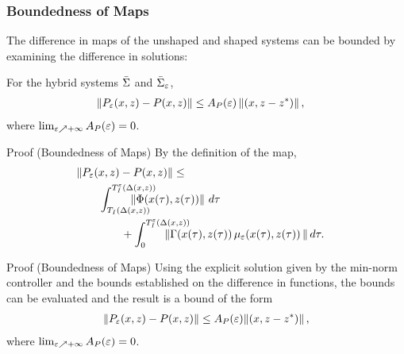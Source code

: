 \begin{frame}[t]
  \frametitle{Boundedness of \Poincare{} Maps}
   {
    The difference in \Poincare{} maps of the unshaped and shaped systems can be
    bounded by examining the difference in solutions:
    \begin{lemma}
      For the hybrid systems $\bar{\Sigma}$ and $\bar{\Sigma}_{\varepsilon}$,
      \begin{eqnarray}
        \nonumber
        &\| P_{\varepsilon}(x, z) - P(x, z) \| \leq A_{P}(\varepsilon) \left\|(x, z - z^{*})\right\|,
      \end{eqnarray}
      where  $\lim_{\varepsilon \nearrow +\infty}A_{P}(\varepsilon) = 0$.
    \end{lemma}
  }

   {
    \begin{block}{Proof (Boundedness of \Poincare{} Maps)}
      By the definition of the \Poincare{} map,
      \begin{align*}
        \lefteqn{\left\| \Pe\argsxz - \P\argsxz \right\| \leq}\\
        & \hspace{2em} \int_{\TIDelta}^{\TIeDelta} \hspace{-2.5em} \left\|
          \bigF\argsxztau \right\| \, d\tau\\
        & \hspace{4em} \mbox{} + \int_{0}^{\TIeDelta} \hspace{-2.5em} \left\|
          \bigG\argsxztau \, \mueps\argsxztau \, \right\| d\tau.
      \end{align*}
    \end{block}
  }

   {
    \begin{block}{Proof (Boundedness of \Poincare{} Maps)}
      Using the explicit solution given by the min-norm controller and the bounds
      established on the difference in \tti{} functions, the bounds can be
      evaluated and the result is a bound of the form
      \begin{align*}
        \left\| P_{\varepsilon}(x, z) - P(x, z) \right\| \leq A_{P}(\varepsilon) \! \left\|(x, z - z^{*})\right\|,
      \end{align*}
      where  $\lim_{\varepsilon \nearrow +\infty}A_{P}(\varepsilon) = 0$. \hfill \qedsymbol
    \end{block}
  }
\end{frame}

